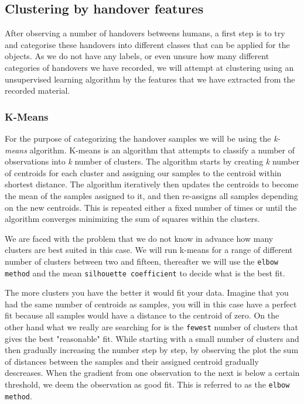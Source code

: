 \subsection{Clustering by handover features}

After observing a number of handovers betweens humans, a first step is to try and categorise these handovers into different classes that can be applied for the objects. As we do not have any labels, or even unsure how many different categories of handovers we have recorded, we will attempt at clustering using an unsupervised learning algorithm by the features that we have extracted from the recorded material.

\subsubsection{K-Means} %

For the purpose of categorizing the handover samples we will be using the \emph{k-means} algorithm. K-means is an algorithm that attempts to classify a number of observations into \emph{k} number of clusters. The algorithm starts by creating \emph{k} number of centroids for each cluster and assigning our samples to the centroid within shortest distance. The algorithm iteratively then updates the centroids to become the mean of the samples assigned to it, and then re-assigns all samples depending on the new centroids. This is repeated either a fixed number of times or until the algorithm converges minimizing the sum of squares within the clusters.

We are faced with the problem that we do not know in advance how many clusters are best suited in this case. We will run k-means for a range of different number of clusters between two and fifteen, thereafter we will use the \texttt{elbow method} and the mean \texttt{silhouette coefficient} to decide what is the best fit.

The more clusters you have the better it would fit your data. Imagine that you had the same number of centroids as samples, you will in this case have a perfect fit because all samples would have a distance to the centroid of zero. On the other hand what we really are searching for is the \texttt{fewest} number of clusters that gives the best "reasonable" fit. While starting with a small number of clusters and then gradually increasing the number step by step, by observing the plot the sum of distances between the samples and their assigned centroid gradually descreases. When the gradient from one observation to the next is below a certain threshold, we deem the observation as good fit. This is referred to as the \texttt{elbow method}.

